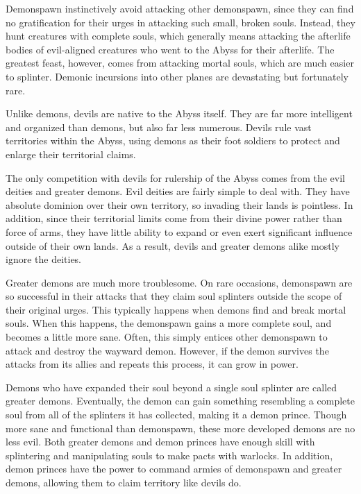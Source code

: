       Demonspawn instinctively avoid attacking other demonspawn, since they can find no gratification for their urges in attacking such small, broken souls.
      Instead, they hunt creatures with complete souls, which generally means attacking the afterlife bodies of evil-aligned creatures who went to the Abyss for their afterlife.
      The greatest feast, however, comes from attacking mortal souls, which are much easier to splinter.
      Demonic incursions into other planes are devastating but fortunately rare.

      Unlike demons, devils are native to the Abyss itself.
      They are far more intelligent and organized than demons, but also far less numerous.
      Devils rule vast territories within the Abyss, using demons as their foot soldiers to protect and enlarge their territorial claims.

      The only competition with devils for rulership of the Abyss comes from the evil deities and greater demons.
      Evil deities are fairly simple to deal with.
      They have absolute dominion over their own territory, so invading their lands is pointless.
      In addition, since their territorial limits come from their divine power rather than force of arms, they have little ability to expand or even exert significant influence outside of their own lands.
      As a result, devils and greater demons alike mostly ignore the deities.

      Greater demons are much more troublesome.
      On rare occasions, demonspawn are so successful in their attacks that they claim soul splinters outside the scope of their original urges.
      This typically happens when demons find and break mortal souls.
      When this happens, the demonspawn gains a more complete soul, and becomes a little more sane.
      Often, this simply entices other demonspawn to attack and destroy the wayward demon.
      However, if the demon survives the attacks from its allies and repeats this process, it can grow in power.

      Demons who have expanded their soul beyond a single soul splinter are called greater demons.
      Eventually, the demon can gain something resembling a complete soul from all of the splinters it has collected, making it a demon prince.
      Though more sane and functional than demonspawn, these more developed demons are no less evil.
      Both greater demons and demon princes have enough skill with splintering and manipulating souls to make pacts with warlocks.
      In addition, demon princes have the power to command armies of demonspawn and greater demons, allowing them to claim territory like devils do.


